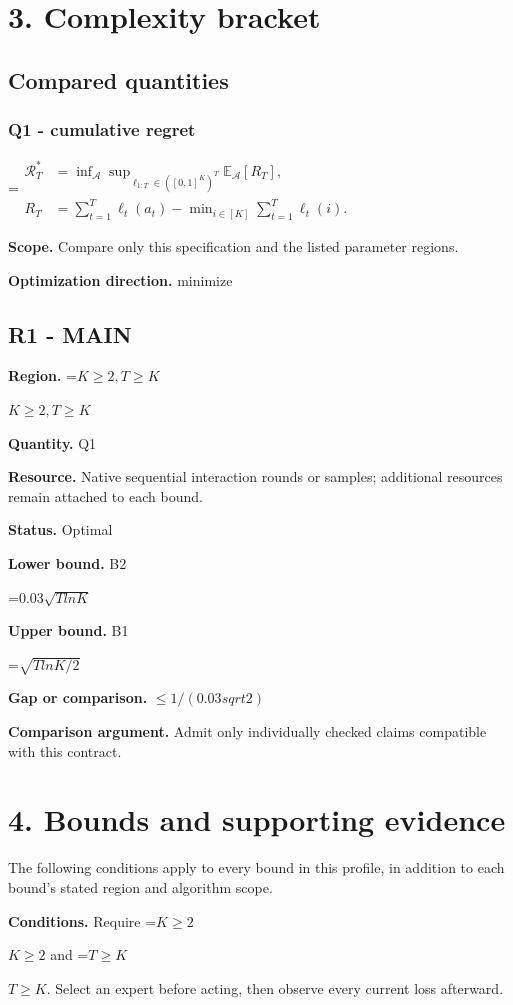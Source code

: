 \documentclass[10pt,a4paper]{article}
\newcommand{\AtlasMath}[1]{\par\begingroup\centering\setbox0=\hbox{$\displaystyle #1$}\ifdim\wd0>1.4\linewidth\typeout{ATLAS WIDE FORMULA: \the\wd0}\fi\ifdim\wd0>\linewidth\resizebox{\linewidth}{!}{\box0}\else\box0\fi\par\endgroup}
\newcommand{\AtlasInlineMath}[1]{\begingroup\setbox0=\hbox{$#1$}\ifdim\wd0>.4\linewidth\endgroup\AtlasMath{#1}\else\endgroup$#1$\fi}
\begin{document}
\section{3. Complexity bracket}
\subsection{Compared quantities}
\subsubsection{Q1 - cumulative regret}
\AtlasMath{\begin{aligned}\mathcal R_T^*&=\inf_{\mathcal A}\sup_{\ell_{1:T}\in([0,1]^K)^T}\mathbb E_{\mathcal A}[R_T],\\ R_T&=\sum_{t=1}^T\ell_t(a_t)-\min_{i\in[K]}\sum_{t=1}^T\ell_t(i).\end{aligned}}
\textbf{Scope.} Compare only this specification and the listed parameter regions.

\textbf{Optimization direction.} minimize

\subsection{R1 - MAIN}
\textbf{Region.} \AtlasInlineMath{K\ge 2, T\ge K}

\textbf{Quantity.} Q1

\textbf{Resource.} Native sequential interaction rounds or samples; additional resources remain attached to each bound.

\textbf{Status.} Optimal

\textbf{Lower bound.} B2

\AtlasMath{0.03 \sqrt{T lnK}}
\textbf{Upper bound.} B1

\AtlasMath{\sqrt{T lnK/2}}
\textbf{Gap or comparison.} $\le 1/(0.03sqrt2)$

\textbf{Comparison argument.} Admit only individually checked claims compatible with this contract.

\section{4. Bounds and supporting evidence}
The following conditions apply to every bound in this profile, in addition to each bound's stated region and algorithm scope.

\textbf{Conditions.} Require \AtlasInlineMath{K\ge2} and \AtlasInlineMath{T\ge K}. Select an expert before acting, then observe every current loss afterward.
\end{document}
